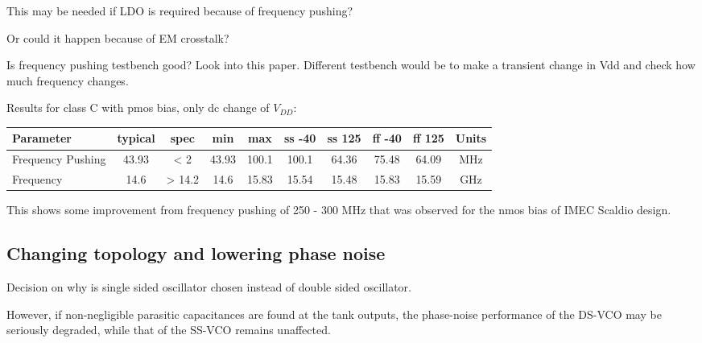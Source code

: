 \documentclass{article}
\begin{document}
\begin{question}
	This may be needed if LDO is required because of frequency pushing?
\end{question}

\begin{question}
	Or could it happen because of EM crosstalk?
\end{question}


Is frequency pushing testbench good? Look into this paper. %
Different testbench would be to make a transient change in Vdd and check how much frequency changes.


Results for class C with pmos bias, only dc change of $V_{DD}$:

\begin{center}
	\begin{tabular}{|l|c|c|c|c|c|c|c|c|c|}
		\hline
		Parameter & typical & spec  & min & max & ss -40 & ss 125 & ff -40 & ff 125 & Units \\
		\hline
		Frequency Pushing & 43.93 & < 2 &  43.93 & 100.1 & 100.1 & 64.36 & 75.48 & 64.09 & MHz \\ 
		\hline
		Frequency  & 14.6 & > 14.2  & 14.6 & 15.83 & 15.54 & 15.48 & 15.83 & 15.59 & GHz  \\ 
		\hline
	\end{tabular}
\end{center}

This shows some improvement from frequency pushing of 250 - 300 MHz that was observed for the nmos bias of IMEC Scaldio design.

\subsection{Changing topology and lowering phase noise}

Decision on why is single sided oscillator chosen instead of double sided oscillator.

\begin{info}
However, if non-negligible parasitic capacitances are found at the tank outputs, the phase-noise performance of the DS-VCO may be seriously degraded, while that of the SS-VCO remains unaffected.
\end{info}
\end{document}
